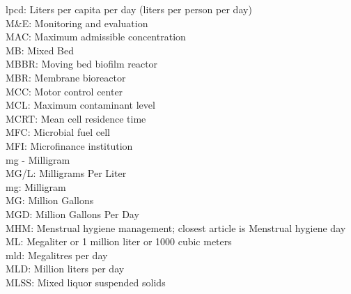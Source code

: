 lpcd:  Liters per capita per day (liters per person per day)
\vspace{0.3cm}\\
M\&E:  Monitoring and evaluation
\vspace{0.3cm}\\
MAC:  Maximum admissible concentration
\vspace{0.3cm}\\
MB:  Mixed Bed
\vspace{0.3cm}\\
MBBR:  Moving bed biofilm reactor
\vspace{0.3cm}\\
MBR:  Membrane bioreactor
\vspace{0.3cm}\\
MCC:  Motor control center
\vspace{0.3cm}\\
MCL:  Maximum contaminant level
\vspace{0.3cm}\\
MCRT:  Mean cell residence time
\vspace{0.3cm}\\
MFC:  Microbial fuel cell
\vspace{0.3cm}\\
MFI:  Microfinance institution
\vspace{0.3cm}\\
mg - Milligram
\vspace{0.3cm}\\
MG/L:  Milligrams Per Liter
\vspace{0.3cm}\\
mg:  Milligram
\vspace{0.3cm}\\
MG:  Million Gallons
\vspace{0.3cm}\\
MGD:  Million Gallons Per Day
\vspace{0.3cm}\\
MHM:  Menstrual hygiene management; closest article is Menstrual hygiene day
\vspace{0.3cm}\\
ML:  Megaliter or 1 million liter or 1000 cubic meters
\vspace{0.3cm}\\
mld:  Megalitres per day
\vspace{0.3cm}\\
MLD:  Million liters per day
\vspace{0.3cm}\\
MLSS:  Mixed liquor suspended solids
